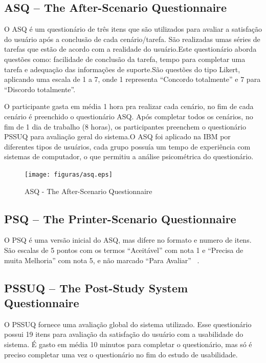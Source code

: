 \subsection{ASQ – The After-Scenario Questionnaire}

O ASQ é um questionário de três itens que são utilizados para avaliar a satisfação do usuário após a conclusão de cada cenário/tarefa. São realizadas umas séries de tarefas que estão de acordo com a realidade do usuário.Este questionário aborda questões como: facilidade de conclusão da tarefa, tempo para completar uma tarefa e adequação das informações de suporte.São questões do tipo Likert, aplicando uma escala de 1 a 7, onde 1 representa “Concordo totalmente” e 7 para “Discordo totalmente”. ~\cite{lewis1995ibm}

O participante gasta em média 1 hora pra realizar cada cenário, no fim de cada cenário é preenchido o questionário ASQ. Após completar todos os cenários, no fim de 1 dia de trabalho (8 horas), os participantes preenchem o questionário PSSUQ para avaliação geral do sistema.O ASQ foi aplicado na IBM por diferentes tipos de usuários, cada grupo possuía um tempo de experiência com sistemas de computador, o que permitiu a análise psicométrica do questionário.

\begin{figure}[!h]
    \centering
    \texttt{[image: figuras/asq.eps]}
    \label{ASQ - The After-Scenario Questionnaire }
	\caption{ASQ - The After-Scenario Questionnaire}
\end{figure}

\subsection{PSQ – The Printer-Scenario Questionnaire}

O PSQ  é uma versão inicial do ASQ, mas difere no formato e numero de itens.  São escalas de 5 pontos com os termos “Aceitável” com nota 1 e “Precisa de muita Melhoria” com nota 5, e não marcado “Para Avaliar” ~\cite{lewis1995ibm}.

\subsection{PSSUQ – The Post-Study System Questionnaire}

	O PSSUQ fornece uma avaliação global do sistema utilizado. Esse questionário possui 19 itens para avaliação da satisfação do usuário com a usabilidade do sistema. É gasto em média 10 minutos para completar o questionário, mas só é preciso completar uma vez o questionário no fim do estudo de usabilidade. ~\cite{lewis1995ibm} 

